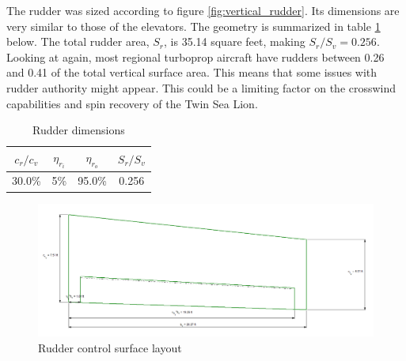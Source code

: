 \documentclass[conf]{new-aiaa}
\begin{document}
The rudder was sized according to figure \ref{fig:vertical_rudder}. Its dimensions are very similar to those of the elevators. The geometry is summarized in table \ref{tab:rudder_size_table} below. The total rudder area, $S_r$, is 35.14 square feet, making $S_r/S_v = 0.256$. Looking at \cite{orange_book} again, most regional turboprop aircraft have rudders between 0.26 and 0.41 of the total vertical surface area. This means that some issues with rudder authority might appear. This could be a limiting factor on the crosswind capabilities and spin recovery of the Twin Sea Lion.

\begin{table}[H]
\centering
\caption{Rudder dimensions}
\begin{tabular}{|c|c|c|c|}\hline
    $c_r/c_v$ & $\eta_{r_i}$ & $\eta_{r_o}$ & $S_r/S_v$ \\ \hline
    30.0\%    & 5\%          & 95.0\%       & 0.256     \\ \hline
\end{tabular}
\label{tab:rudder_size_table}
\end{table}

\begin{figure}[H]
    \includegraphics[width=\textwidth]{Report3Printouts/Empannage/Vertical_rudder_plot.png}
    \caption{Rudder control surface layout}
    \label{fig:vertical_rudder_plot}
\end{figure}


\end{document}
